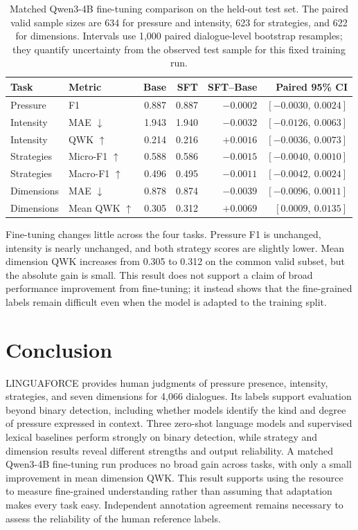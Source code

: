 \documentclass[11pt]{article}
\newcommand{\LNGF}{LINGUAFORCE}
\begin{document}
\begin{table}[t]
\centering\small
\setlength{\tabcolsep}{4pt}
\begin{tabular}{@{}llrrrr@{}}
\toprule
\textbf{Task} & \textbf{Metric} & \textbf{Base} & \textbf{SFT} &
\textbf{SFT--Base} & \textbf{Paired 95\% CI}\\
\midrule
Pressure & F1 & 0.887 & 0.887 & $-0.0002$ & $[-0.0030,\ 0.0024]$\\
Intensity & MAE $\downarrow$ & 1.943 & 1.940 & $-0.0032$ & $[-0.0126,\ 0.0063]$\\
Intensity & QWK $\uparrow$ & 0.214 & 0.216 & $+0.0016$ & $[-0.0036,\ 0.0073]$\\
Strategies & Micro-F1 $\uparrow$ & 0.588 & 0.586 & $-0.0015$ & $[-0.0040,\ 0.0010]$\\
Strategies & Macro-F1 $\uparrow$ & 0.496 & 0.495 & $-0.0011$ & $[-0.0042,\ 0.0024]$\\
Dimensions & MAE $\downarrow$ & 0.878 & 0.874 & $-0.0039$ & $[-0.0096,\ 0.0011]$\\
Dimensions & Mean QWK $\uparrow$ & 0.305 & 0.312 & $+0.0069$ & $[0.0009,\ 0.0135]$\\
\bottomrule
\end{tabular}
\caption{Matched Qwen3-4B fine-tuning comparison on the held-out test set.
The paired valid sample sizes are 634 for pressure and intensity, 623 for
strategies, and 622 for dimensions. Intervals use 1,000 paired dialogue-level
bootstrap resamples; they quantify uncertainty from the observed test sample
for this fixed training run.}
\label{tab:finetune_4b}
\end{table}

Fine-tuning changes little across the four tasks. Pressure F1 is unchanged,
intensity is nearly unchanged, and both strategy scores are slightly lower.
Mean dimension QWK increases from 0.305 to 0.312 on the common valid subset,
but the absolute gain is small. This result does not support a claim of broad
performance improvement from fine-tuning; it instead shows that the
fine-grained labels remain difficult even when the model is adapted to the
training split.



\section{Conclusion}
\LNGF{} provides human judgments of pressure presence, intensity, strategies,
and seven dimensions for 4,066 dialogues. Its labels support evaluation
beyond binary detection, including whether models identify the kind and
degree of pressure expressed in context. Three zero-shot language models
and supervised lexical baselines perform strongly on binary detection,
while strategy and dimension results reveal different strengths and output
reliability. A matched Qwen3-4B fine-tuning run produces no broad gain across
tasks, with only a small improvement in mean dimension QWK. This result
supports using the resource to measure fine-grained understanding rather than
assuming that adaptation makes every task easy. Independent annotation
agreement remains necessary to assess the reliability of the human reference
labels.
\end{document}
